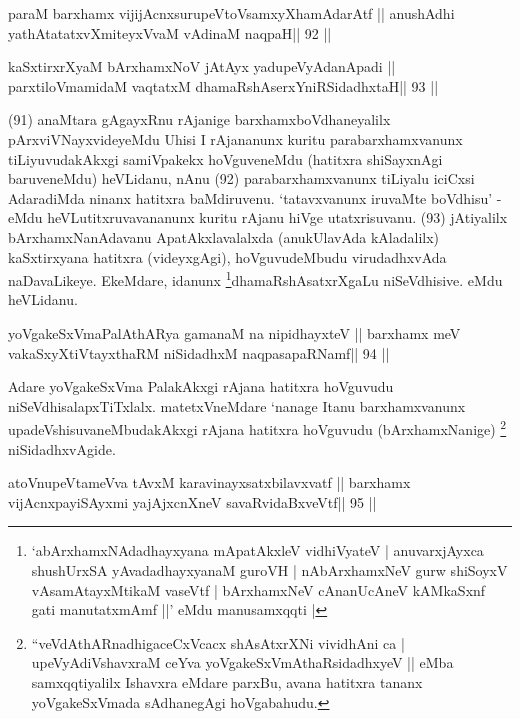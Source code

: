 \begin{shl}
paraM barxhamx vijijAcnxsurupeVtoV\s samxyXhamAdarAtf ||
anushAdhi yathAtatatxvXmiteyxVvaM vAdinaM naqpaH\hfill || 92 ||
\end{shl}

\begin{shl}
kaSxtirxrXyaM bArxhamxNoV jAtAyx yadupeVyAdanApadi ||
parxtiloVmamidaM vaqtatxM dhamaRshAserxYniRSidadhxtaH\hfill || 93 ||
\end{shl}

\begin{artha}
(91) anaMtara gAgayxRnu rAjanige barxhamxboVdhaneyalilx 
pArxviVNayxvideyeMdu Uhisi I rAjananunx kuritu parabarxhamxvanunx 
tiLiyuvudakAkxgi samiVpakekx hoVguveneMdu (hatitxra shiSayxnAgi 
baruveneMdu) heVLidanu, nAnu (92) parabarxhamxvanunx tiLiyalu iciCxsi 
AdaradiMda ninanx hatitxra baMdiruvenu. `tatavxvanunx iruvaMte 
boVdhisu' - eMdu heVLutitxruvavananunx kuritu rAjanu hiVge 
utatxrisuvanu. (93) jAtiyalilx bArxhamxNanAdavanu ApatAkxlavalalxda 
(anukUlavAda kAladalilx) kaSxtirxyana hatitxra (videyxgAgi), 
hoVguvudeMbudu virudadhxvAda naDavaLikeye. EkeMdare, idanunx 
\footnote[10]{`abArxhamxNAdadhayxyana mApatAkxleV vidhiVyateV | 
anuvarxjAyxca shushUrxSA yAvadadhayxyanaM guroVH | nAbArxhamxNeV gurw 
shiSoyxV vAsamAtayxMtikaM vaseVtf | bArxhamxNeV cAnanUcAneV kAMkaSxnf 
gati manutatxmAmf ||' eMdu manusamxqqti |}dhamaRshAsatxrXgaLu niSeVdhisive. eMdu heVLidanu.
\end{artha} 

\begin{shl}
yoVgakeSxVmaPalAthARya gamanaM na nipidhayxteV ||
barxhamx meV vakaSxyXtiVtayxthaRM niSidadhxM naqpasapaRNamf\hfill || 94 ||
\end{shl}

\begin{artha}
Adare yoVgakeSxVma PalakAkxgi rAjana hatitxra hoVguvudu 
niSeVdhisalapxTiTxlalx. matetxVneMdare `nanage Itanu barxhamxvanunx 
upadeVshisuvaneMbudakAkxgi rAjana hatitxra hoVguvudu (bArxhamxNanige) 
\footnote[11]{``veVdAthARnadhigaceCxVcacx shAsAtxrXNi vividhAni ca | 
upeVyAdiVshavxraM ceYva yoVgakeSxVmAthaRsidadhxyeV || eMba samxqqtiyalilx Ishavxra eMdare parxBu, avana hatitxra tananx yoVgakeSxVmada sAdhanegAgi hoVgabahudu.} niSidadhxvAgide.
\end{artha}

\begin{shl}
atoV\s nupeVtameVva tAvxM karavinayxsatxbilavxvatf ||
barxhamx vijAcnxpayiSAyxmi yajAjxcnXneV savaRvidaBxveVtf\hfill || 95 ||
\end{shl}

